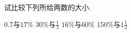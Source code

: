 试比较下列所给两数的大小.
\begin{subquestions}
    \subquestion $0.7$与$17\%$
    \subquestion $30\%$与$\frac{1}{3}$
    \subquestion $16\%$与$60\%$
    \subquestion $150\%$与$1\frac{1}{2}$

\end{subquestions}
